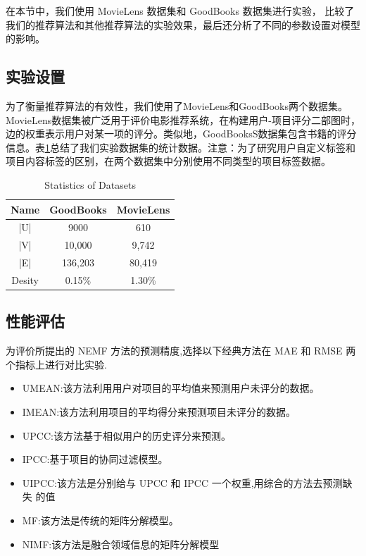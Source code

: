\documentclass[lang=cn,11pt]{elegantpaper}
\begin{document}
在本节中，我们使用 MovieLens 数据集和 GoodBooks 数据集进行实验，
比较了我们的推荐算法和其他推荐算法的实验效果，最后还分析了不同的参数设置对模型的影响。

\subsection{实验设置}
为了衡量推荐算法的有效性，我们使用了MovieLens和GoodBooks两个数据集。MovieLens数据集被广泛用于评价电影推荐系统\cite{He2017}，在构建用户-项目评分二部图时，边的权重表示用户对某一项的评分。类似地，GoodBooksS数据集包含书籍的评分信息。表\ref{tab:set}总结了我们实验数据集的统计数据。注意：为了研究用户自定义标签和项目内容标签的区别，在两个数据集中分别使用不同类型的项目标签数据。

\begin{table}[htbp]
	\centering
	\caption{Statistics of Datasets \label{tab:set}}
	\setlength{\tabcolsep}{7mm}
	\begin{tabular}{ccc}
		\toprule
		
		Name &  GoodBooks &  MovieLens \\
		\midrule
		
		|U| &       9000 &        610 \\
		
		|V| &     10,000 &      9,742 \\
		
		|E| &    136,203 &     80,419 \\
		
		Desity &     0.15\% &     1.30\% \\
		\bottomrule
	\end{tabular}  
	
	
\end{table}
	
	
\subsection{性能评估}

为评价所提出的 NEMF 方法的预测精度,选择以下经典方法在 MAE 和 RMSE 两个指标上进行对比实验.

\begin{itemize}
	\item UMEAN:该方法利用用户对项目的平均值来预测用户未评分的数据。
	\item IMEAN:该方法利用项目的平均得分来预测项目未评分的数据。
	\item UPCC:该方法基于相似用户的历史评分来预测。
	\item IPCC:基于项目的协同过滤模型。
	\item UIPCC:该方法是分别给与 UPCC 和 IPCC 一个权重,用综合的方法去预测缺失
	的值
	\item MF:该方法是传统的矩阵分解模型。
	\item NIMF:该方法是融合领域信息的矩阵分解模型
\end{itemize}
\end{document}
